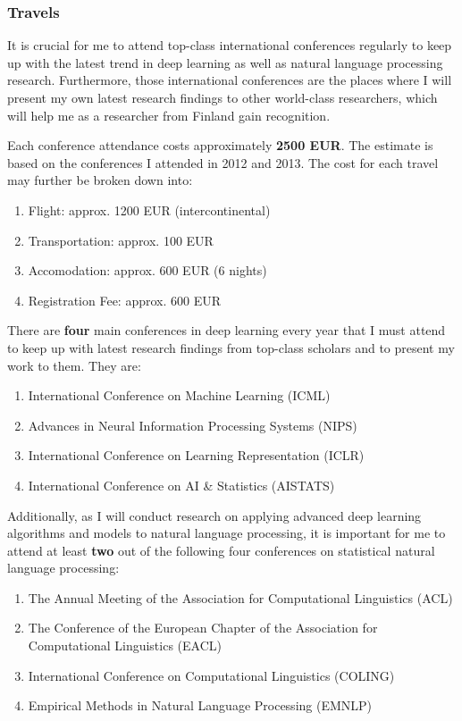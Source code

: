 \documentclass[11pt, oneside]{essay}
\begin{document}
\subsubsection{Travels}

It is crucial for me to attend top-class international
conferences regularly to keep up with the latest trend in deep
learning as well as natural language processing research.
Furthermore, those international conferences are the places where
I will present my own latest research findings to other
world-class researchers, which will help me as a researcher from
Finland gain recognition.

Each conference attendance costs approximately \textbf{2500 EUR}.
The estimate is based on the conferences I attended in 2012 and
2013. The cost for each travel may further be broken down into:
\begin{enumerate}
    \item Flight: approx. 1200 EUR (intercontinental)
    \item Transportation: approx. 100 EUR
    \item Accomodation: approx. 600 EUR (6 nights)
    \item Registration Fee: approx. 600 EUR
\end{enumerate}

There are \textbf{four} main conferences in deep learning every
year that I must attend to keep up with latest research findings
from top-class scholars and to present my work to them. They are:
\begin{enumerate}
    \item International Conference on Machine Learning (ICML)
    \item Advances in Neural Information Processing Systems (NIPS)
    \item International Conference on Learning Representation (ICLR)
    \item International Conference on AI \& Statistics (AISTATS)
\end{enumerate}

Additionally, as I will conduct research on applying advanced
deep learning algorithms and models to natural language
processing, it is important for me to attend at least
\textbf{two} out of the following
four conferences on statistical natural language processing:
\begin{enumerate}
    \item The Annual Meeting of the Association for Computational Linguistics (ACL)
    \item The Conference of the European Chapter of the
    Association for Computational Linguistics (EACL)
    \item International Conference on Computational Linguistics (COLING)
    \item Empirical Methods in Natural Language Processing (EMNLP)
\end{enumerate}
\end{document}
